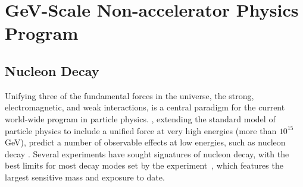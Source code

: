 \chapter{GeV-Scale Non-accelerator Physics Program}
\label{ch:nonaccel}


\section{Nucleon Decay}
\label{sec:nonaccel-ndk}





Unifying three of the fundamental forces in the universe, the strong, 
electromagnetic, and weak interactions, is a central paradigm for the current 
world-wide program in particle physics. , extending the standard model of particle physics to include a unified force 
at very high energies  (more than $10^{15}$ GeV), predict a number of observable 
effects at low energies, such as nucleon  decay \cite{Pati:1973rp,Georgi:1974sy,Dimopoulos:1981dw,Langacker:1980js,deBoer:1994dg,Nath:2006ut}. Several experiments have sought signatures of nucleon decay, with the best limits for most decay modes set by the \superk experiment~\cite{Miura:2016krn,Abe:2014mwa,TheSuper-Kamiokande:2017tit}, 
which features the largest sensitive mass and exposure to date. 

